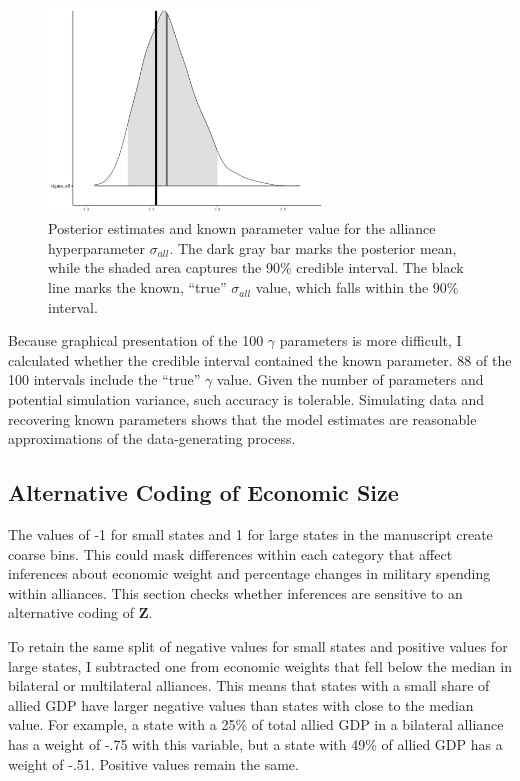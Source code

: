 \documentclass[12pt]{article}
\begin{document}
\begin{figure}[htbp]
	\centering
		\includegraphics[width=0.65\textwidth]{sall-sim-res.pdf}
	\caption{Posterior estimates and known parameter value for the alliance hyperparameter $\sigma_{all}$. The dark gray bar marks the posterior mean, while the shaded area captures the 90\% credible interval. The black line marks the known, ``true'' $\sigma_{all}$ value, which falls within the 90\% interval.}
	\label{fig:sall-sim-res}
\end{figure}


Because graphical presentation of the 100 $\gamma$ parameters is more difficult, I calculated whether the credible interval contained the known parameter. 
88 of the 100 intervals include the ``true'' $\gamma$ value. 
Given the number of parameters and potential simulation variance, such accuracy is tolerable. 
Simulating data and recovering known parameters shows that the model estimates are reasonable approximations of the data-generating process. 


\subsection{Alternative Coding of Economic Size}


The values of -1 for small states and 1 for large states in the manuscript create coarse bins. 
This could mask differences within each category that affect inferences about economic weight and percentage changes in military spending within alliances. 
This section checks whether inferences are sensitive to an alternative coding of $\textbf{Z}$. 


To retain the same split of negative values for small states and positive values for large states, I subtracted one from economic weights that fell below the median in bilateral or multilateral alliances. 
This means that states with a small share of allied GDP have larger negative values than states with close to the median value. 
For example, a state with a 25\% of total allied GDP  in a bilateral alliance has a weight of -.75 with this variable, but a state with 49\% of allied GDP has a weight of -.51. 
Positive values remain the same.
\end{document}
